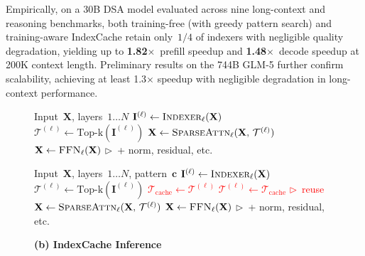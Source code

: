 Empirically, on a 30B DSA model evaluated across nine long-context and reasoning benchmarks, both training-free (with greedy pattern search) and training-aware IndexCache retain only~$1/4$ of indexers with negligible quality degradation, yielding up to \textbf{1.82$\times$}~prefill speedup and \textbf{1.48$\times$}~decode speedup at 200K context length. Preliminary results on the 744B GLM-5 further confirm scalability, achieving at least 1.3$\times$ speedup with negligible degradation in long-context performance.

\begin{figure}[t]
\centering
\begin{minipage}[t]{0.48\textwidth}
\begin{algorithm}[H]
\caption*{\textbf{(a) Standard DSA Inference}}
\begin{algorithmic}[1]
\REQUIRE Input~$\mathbf{X}$, layers~$1 \ldots N$
    \STATE $\mathbf{I}^{(\ell)} \leftarrow \textsc{Indexer}_\ell(\mathbf{X})$
    \STATE $\mathcal{T}^{(\ell)} \leftarrow \mathrm{Top\text{-}k}(\mathbf{I}^{(\ell)})$
    \STATE $\mathbf{X} \leftarrow \textsc{SparseAttn}_\ell(\mathbf{X},\, \mathcal{T}^{(\ell)})$
    \STATE $\mathbf{X} \leftarrow \textsc{FFN}_\ell(\mathbf{X})$ \hfill $\triangleright$~\textrm{\small + norm, residual, etc.}
\ENDFOR
\end{algorithmic}
\end{algorithm}
\end{minipage}
\hfill
\begin{minipage}[t]{0.48\textwidth}
\begin{algorithm}[H]
\caption*{\textbf{(b) IndexCache Inference}}
\begin{algorithmic}[1]
\REQUIRE Input~$\mathbf{X}$, layers~$1 \ldots N$, pattern~$\mathbf{c}$
        \STATE $\mathbf{I}^{(\ell)} \leftarrow \textsc{Indexer}_\ell(\mathbf{X})$
        \STATE $\mathcal{T}^{(\ell)} \leftarrow \mathrm{Top\text{-}k}(\mathbf{I}^{(\ell)})$
        \STATE \textcolor{red}{$\mathcal{T}_{\mathrm{cache}} \leftarrow \mathcal{T}^{(\ell)}$}
    \ELSE[\textcolor{red}{$c_\ell = \texttt{S}$}]
        \STATE \textcolor{red}{$\mathcal{T}^{(\ell)} \leftarrow \mathcal{T}_{\mathrm{cache}}$} \hfill \textcolor{red}{$\triangleright$~reuse}
    \ENDIF
    \STATE $\mathbf{X} \leftarrow \textsc{SparseAttn}_\ell(\mathbf{X},\, \mathcal{T}^{(\ell)})$
    \STATE $\mathbf{X} \leftarrow \textsc{FFN}_\ell(\mathbf{X})$ \hfill $\triangleright$~\textrm{\small + norm, residual, etc.}

\end{algorithmic}
\end{algorithm}
\end{minipage}
\end{figure}
